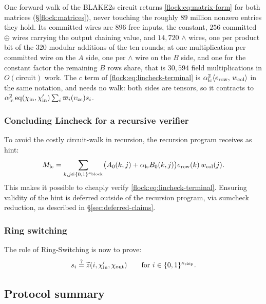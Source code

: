 One forward walk of the BLAKE2s circuit returns \eqref{flock:eq:matrix-form} for both matrices (\S\ref{flock:matrices}), never touching the roughly $89$ million nonzero entries they hold. Its committed wires are $896$ free inputs, the constant, $256$ committed $\oplus$ wires carrying the output chaining value, and $14{,}720$ $\wedge$ wires, one per product bit of the $320$ modular additions of the ten rounds; at one multiplication per committed wire on the $A$ side, one per $\wedge$ wire on the $B$ side, and one for the constant factor the remaining $B$ rows share, that is $30{,}594$ field multiplications in $O(\text{circuit})$ work. The $c$ term of \eqref{flock:eq:lincheck-terminal} is $\alpha_{\mathrm{lc}}^2\langle e_{\mathrm{row}},\, w_{\mathrm{col}} \rangle$ in the same notation, and needs no walk: both sides are tensors, so it contracts to $\alpha_{\mathrm{lc}}^2\operatorname{eq}(\chi_{\mathrm{in}},\chi'_{\mathrm{in}})\sum_i\varpi_i(\upsilon_{\mathrm{zc}})s_i$.

\subsubsection{Concluding Lincheck for a recursive verifier}\label{flock:defer}

To avoid the costly circuit-walk in recursion, the recursion program receives as hint:
\begin{equation}\label{flock:eq:matpart}
M_{\mathrm{lc}}=\sum_{k,j\in\{0,1\}^{\kappa_{\mathrm{block}}}}\bigl(A_0(k,j)+\alpha_{\mathrm{lc}} B_0(k,j)\bigr)e_{\mathrm{row}}(k)\,w_{\mathrm{col}}(j).
\end{equation}
This makes it possible to cheaply verify \eqref{flock:eq:lincheck-terminal}. Ensuring validity of the hint is deferred outside of the recursion program, via sumcheck reduction, as described in \S\ref{sec:deferred-claims}.

\subsubsection{Ring switching}\label{flock:ringswitch}

The role of Ring-Switching is now to prove:
\[
s_i \stackrel{?}{=} \widetilde{z}(i,\chi'_{\mathrm{in}},\chi_{\mathrm{out}})\qquad\text{for }i\in\{0,1\}^{\kappa_{\mathrm{skip}}}.
\]


\subsection{Protocol summary}\label{flock:summary}

